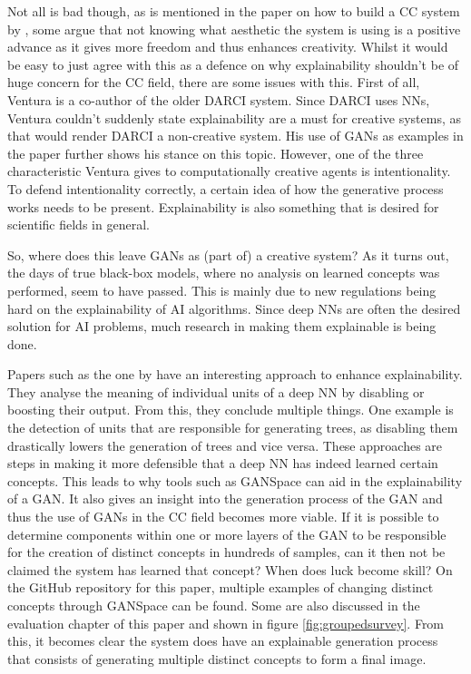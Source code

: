 Not all is bad though, as is mentioned in the paper on how to build a CC system by \citet{ventura}, some argue that not knowing what aesthetic the system is using is a positive advance as it gives more freedom and thus enhances creativity.
Whilst it would be easy to just agree with this as a defence on why explainability shouldn't be of huge concern for the CC field, there are some issues with this.
First of all, Ventura is a co-author of the older DARCI system.
Since DARCI uses NNs, Ventura couldn't suddenly state explainability are a must for creative systems, as that would render DARCI a non-creative system.
His use of GANs as examples in the paper further shows his stance on this topic.
However, one of the three characteristic Ventura gives to computationally creative agents is intentionality.
To defend intentionality correctly, a certain idea of how the generative process works needs to be present.
Explainability is also something that is desired for scientific fields in general.

\clearpage
So, where does this leave GANs as (part of) a creative system?
As it turns out, the days of true black-box models, where no analysis on learned concepts was performed, seem to have passed.
This is mainly due to new regulations being hard on the explainability of AI algorithms. 
Since deep NNs are often the desired solution for AI problems, much research in making them explainable is being done.

Papers such as the one by \citet{invidualunitanalysis} have an interesting approach to enhance explainability.
They analyse the meaning of individual units of a deep NN by disabling or boosting their output.
From this, they conclude multiple things.
One example is the detection of units that are responsible for generating trees, as disabling them drastically lowers the generation of trees and vice versa.
These approaches are steps in making it more defensible that a deep NN has indeed learned certain concepts.
This leads to why tools such as GANSpace can aid in the explainability of a GAN.
It also gives an insight into the generation process of the GAN and thus the use of GANs in the CC field becomes more viable.
If it is possible to determine components within one or more layers of the GAN to be responsible for the creation of distinct concepts in hundreds of samples, can it then not be claimed the system has learned that concept?
When does luck become skill?
On the GitHub repository for this paper, multiple examples of changing distinct concepts through GANSpace can be found.
Some are also discussed in the evaluation chapter of this paper and shown in figure \ref{fig:groupedsurvey}.
From this, it becomes clear the system does have an explainable generation process that consists of generating multiple distinct concepts to form a final image.

